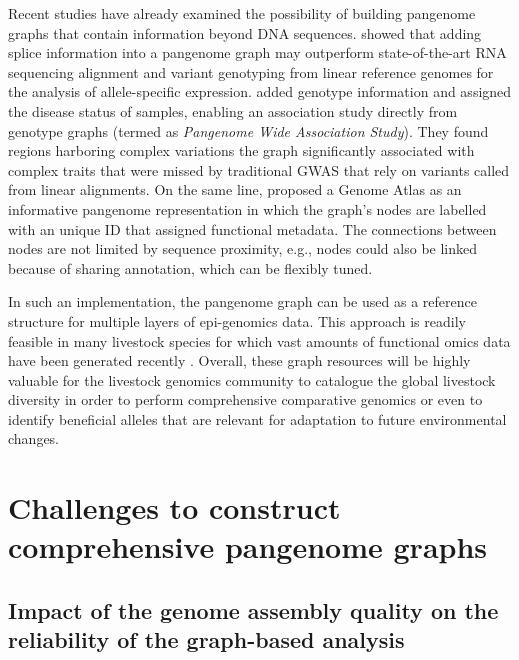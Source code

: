 \documentclass[../main.tex]{subfiles}
\begin{document}
Recent studies have already examined the possibility of building pangenome graphs that contain information beyond DNA sequences. \citet{Sibbesen2021} showed that adding splice information into a pangenome graph may outperform state-of-the-art RNA sequencing alignment and variant genotyping from linear reference genomes for the analysis of allele-specific expression. \citet{Hokin2020} added genotype information and assigned the disease status of samples, enabling an association study directly from genotype graphs (termed as \emph{Pangenome Wide Association Study}). They found regions harboring complex variations the graph significantly associated with complex traits that were missed by traditional GWAS that rely on variants called from linear alignments. On the same line, \citet{kaye2021genome} proposed a Genome Atlas as an informative pangenome representation in which the graph’s nodes are labelled with an unique ID that assigned functional metadata. The connections between nodes are not limited by sequence proximity, e.g., nodes could also be linked because of sharing annotation, which can be flexibly tuned. 

In such an implementation, the pangenome graph can be used as a reference structure for multiple layers of epi-genomics data. This approach is readily feasible in many livestock species for which vast amounts of functional omics data have been generated recently \citep{clark2020faang}. Overall, these graph resources will be highly valuable for the livestock genomics community to catalogue the global livestock diversity in order to perform comprehensive comparative genomics or even to identify beneficial alleles that are relevant for adaptation to future environmental changes.  

\section{Challenges to construct comprehensive pangenome graphs}

\subsection*{Impact of the genome assembly quality on the reliability of the graph-based analysis}
\end{document}
